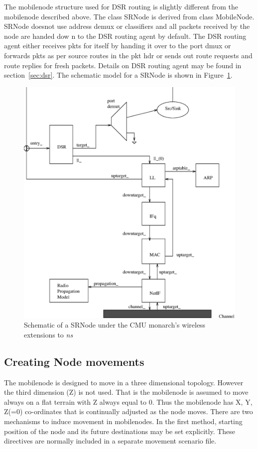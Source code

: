 The mobilenode structure used for DSR routing is slightly different from
the mobilenode described above. The class SRNode is derived from class
MobileNode. SRNode doesnot use address demux or classifiers and all
packets received by the node are handed dow   
n to the DSR routing agent by default. The DSR routing agent either
receives pkts for itself by handing it over to the port dmux or forwards
pkts as per source routes in the pkt hdr or sends out route requests and
route replies for fresh packets. Details    
on DSR routing agent may be found in section~\ref{sec:dsr}. The schematic
model for a SRNode is shown in Figure~\ref{fig:mobilenode-dsr}. 
\begin{figure}[tb]
    \centerline{\includegraphics{dsr}}
    \caption{Schematic of a SRNode under the CMU monarch's wireless
      extensions to \emph{ns}} 
    \label{fig:mobilenode-dsr}
\end{figure}

\subsection{Creating Node movements}
\label{sec:mobilenode-movements}

The mobilenode is designed to move in a three dimensional topology. However the third dimension (Z) is not used. That is the mobilenode is assumed to move always on a flat terrain with Z always equal to 0.
Thus the mobilenode has X, Y, Z(=0) co-ordinates that is continually adjusted as the node moves. There are two mechanisms to induce movement in mobilenodes. 
In the first method, starting position of the node and its future destinations may be set explicitly. These directives are normally included in a separate movement scenario file. 

